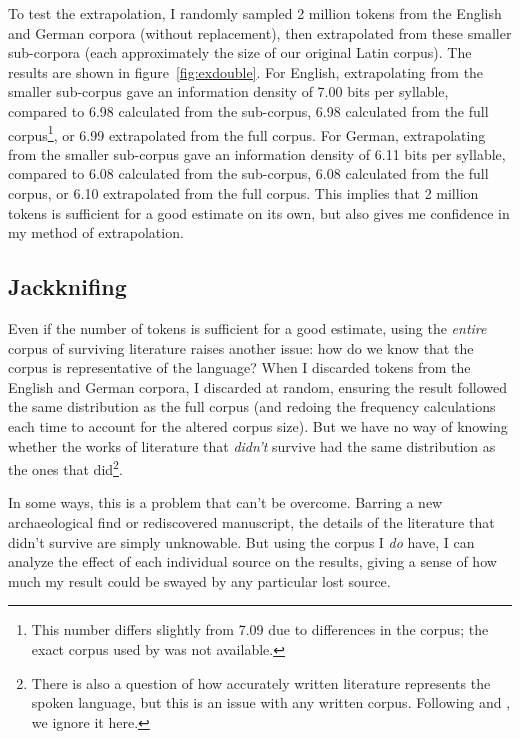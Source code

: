 \documentclass[12pt,twoside]{article}
\begin{document}
To test the extrapolation, I randomly sampled 2 million tokens from the English and German corpora (without replacement), then extrapolated from these smaller sub-corpora (each approximately the size of our original Latin corpus). The results are shown in figure~\ref{fig:exdouble}. For English, extrapolating from the smaller sub-corpus gave an information density of 7.00 bits per syllable, compared to 6.98 calculated from the sub-corpus, 6.98 calculated from the full corpus\footnote{This number differs slightly from  7.09 due to differences in the corpus; the exact corpus used by \citeauthor{oh} was not available.}, or 6.99 extrapolated from the full corpus. For German, extrapolating from the smaller sub-corpus gave an information density of 6.11 bits per syllable, compared to 6.08 calculated from the sub-corpus, 6.08 calculated from the full corpus, or 6.10 extrapolated from the full corpus. This implies that 2 million tokens is sufficient for a good estimate on its own, but also gives me confidence in my method of extrapolation.

\subsection{Jackknifing}

Even if the number of tokens is sufficient for a good estimate, using the \emph{entire} corpus of surviving literature raises another issue: how do we know that the corpus is representative of the language? When I discarded tokens from the English and German corpora, I discarded at random, ensuring the result followed the same distribution as the full corpus (and redoing the frequency calculations each time to account for the altered corpus size). But we have no way of knowing whether the works of literature that \emph{didn't} survive had the same distribution as the ones that did\footnote{There is also a question of how accurately written literature represents the spoken language, but this is an issue with any written corpus. Following \citereset\citet{oh} and \citet{coupé}, we ignore it here.}. %

In some ways, this is a problem that can't be overcome. Barring a new archaeological find or rediscovered manuscript, the details of the literature that didn't survive are simply unknowable. But using the corpus I \emph{do} have, I can analyze the effect of each individual source on the results, giving a sense of how much my result could be swayed by any particular lost source.
\end{document}
